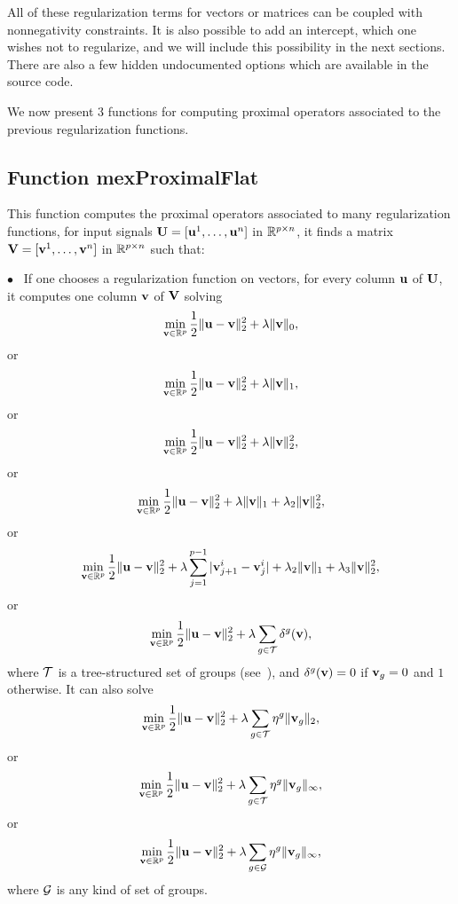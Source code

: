 \documentclass[a4paper, 11pt]{article}
\begin{document}
All of these regularization terms for vectors or matrices can be coupled with
nonnegativity constraints.  It is also possible to add an intercept, which one
wishes not to regularize, and we will include this possibility in the next
sections. There are also a few hidden undocumented options which are available in the source code.

We now present 3 functions for computing proximal operators associated to the previous regularization functions.
\subsection{Function mexProximalFlat}
This function computes the proximal operators associated to many regularization functions, for input signals ${\mathbf U}=[{\mathbf u}^1,\ldots,{\mathbf u}^n]$ in ${\mathbb R}^{p \times n}$, it finds a matrix ${\mathbf V}=[{\mathbf v}^1,\ldots,{\mathbf v}^n]$ in ${\mathbb R}^{p \times n}$ such that:

$\bullet$~ If one chooses a regularization function on vectors, for every column ${\mathbf u}$ of ${\mathbf U}$, it computes one column ${\mathbf v}$ of ${\mathbf V}$ solving
\begin{equation}
\min_{{\mathbf v} \in {\mathbb R}^p} \frac{1}{2}\|{\mathbf u}-{\mathbf v}\|_2^2 + \lambda \|{\mathbf v}\|_0,
\end{equation}
or
\begin{equation}
\min_{{\mathbf v} \in {\mathbb R}^p} \frac{1}{2}\|{\mathbf u}-{\mathbf v}\|_2^2 + \lambda \|{\mathbf v}\|_1,
\end{equation}
or
\begin{equation}
\min_{{\mathbf v} \in {\mathbb R}^p} \frac{1}{2}\|{\mathbf u}-{\mathbf v}\|_2^2 + \lambda \|{\mathbf v}\|_2^2,
\end{equation}
or
\begin{equation}
\min_{{\mathbf v} \in {\mathbb R}^p} \frac{1}{2}\|{\mathbf u}-{\mathbf v}\|_2^2 + \lambda \|{\mathbf v}\|_1 + \lambda_2\|{\mathbf v}\|_2^2,
\end{equation}
or
\begin{equation}
\min_{{\mathbf v} \in {\mathbb R}^p} \frac{1}{2}\|{\mathbf u}-{\mathbf v}\|_2^2 + \lambda\sum_{j=1}^{p-1}|{\mathbf v}_{j+1}^i-{\mathbf v}_j^i|+\lambda_2 \|{\mathbf v}\|_1 + \lambda_3\|{\mathbf v}\|_2^2,
\end{equation}
or
\begin{equation}
\min_{{\mathbf v} \in {\mathbb R}^p} \frac{1}{2}\|{\mathbf u}-{\mathbf v}\|_2^2 + \lambda \sum_{g \in {\mathcal T}} \delta^g({\mathbf v}),
\end{equation}
where ${\mathcal T}$ is a tree-structured set of groups (see~\cite{jenatton4}), and $\delta^g({\mathbf v}) = 0$ if ${\mathbf v}_g=0$ and $1$ otherwise.
It can also solve
\begin{equation}
\min_{{\mathbf v} \in {\mathbb R}^p} \frac{1}{2}\|{\mathbf u}-{\mathbf v}\|_2^2 + \lambda \sum_{g \in {\mathcal T}} \eta^g \|{\mathbf v}_g\|_2,
\end{equation}
or
\begin{equation}
\min_{{\mathbf v} \in {\mathbb R}^p} \frac{1}{2}\|{\mathbf u}-{\mathbf v}\|_2^2 + \lambda \sum_{g \in {\mathcal T}} \eta^g \|{\mathbf v}_g\|_\infty,
\end{equation}
or
\begin{equation}
\min_{{\mathbf v} \in {\mathbb R}^p} \frac{1}{2}\|{\mathbf u}-{\mathbf v}\|_2^2 + \lambda \sum_{g \in {\mathcal G}} \eta^g \|{\mathbf v}_g\|_\infty,
\end{equation}
where ${\mathcal G}$ is any kind of set of groups.
\end{document}
